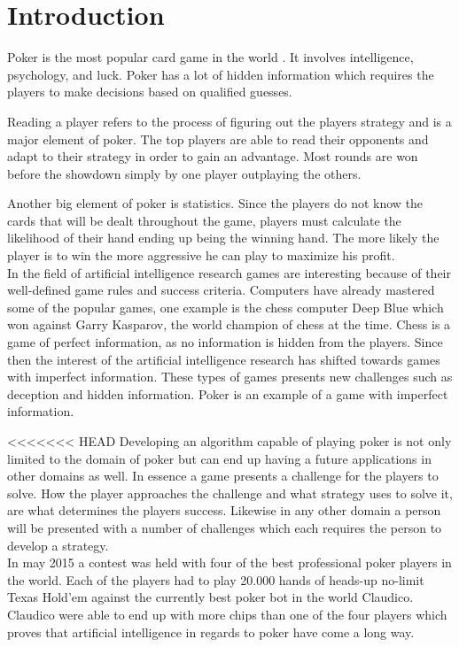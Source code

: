 \section*{Introduction}
Poker is the most popular card game in the world \cite{poker-popular}. It involves intelligence, psychology, and luck. Poker has a lot of hidden information which requires the players to make decisions based on qualified guesses.  

Reading a player refers to the process of figuring out the players strategy and is a major element of poker. The top players are able to read their opponents and adapt to their strategy in order to gain an advantage. Most rounds are won before the showdown simply by one player outplaying the others. 

Another big element of poker is statistics. Since the players do not know the cards that will be dealt throughout the game, players must calculate the likelihood of their hand ending up being the winning hand. The more likely the player is to win the more aggressive he can play to maximize his profit.\\


In the field of artificial intelligence research games are interesting because of their well-defined game rules and success criteria.
Computers have already mastered some of the popular games, one example is the chess computer Deep Blue which won against Garry Kasparov, the world champion of chess at the time.
Chess is a game of perfect information, as no information is hidden from the players.
Since then the interest of the artificial intelligence research has shifted towards games with imperfect information. These types of games presents new challenges such as deception and hidden information. Poker is an example of a game with imperfect information.

<<<<<<< HEAD
Developing an algorithm capable of playing poker is not only limited to the domain of poker but can end up having a future applications in other domains as well. In essence a game presents a challenge for the players to solve. How the player approaches the challenge and what strategy uses to solve it, are what determines the players success. Likewise in any other domain a person will be presented with a number of challenges which each requires the person to develop a strategy.\\

In may 2015 a contest was held with four of the best professional poker players in the world. Each of the players had to play 20.000 hands of heads-up no-limit Texas Hold'em against the currently best poker bot in the world Claudico. Claudico were able to end up with more chips than one of the four players which proves that artificial intelligence in regards to poker have come a long way.


